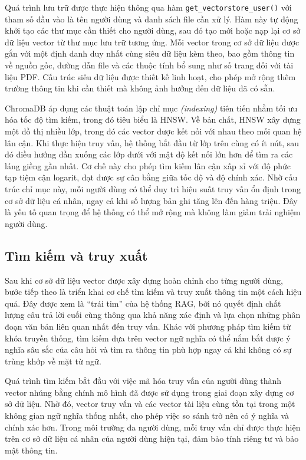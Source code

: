 Quá trình lưu trữ được thực hiện thông qua hàm \texttt{get\_vectorstore\_user()} với tham số đầu vào là tên người dùng và danh sách file cần xử lý. Hàm này tự động khởi tạo các thư mục cần thiết cho người dùng, sau đó tạo mới hoặc nạp lại cơ sở dữ liệu vector từ thư mục lưu trữ tương ứng. Mỗi vector trong cơ sở dữ liệu được gắn với một định danh duy nhất cùng siêu dữ liệu kèm theo, bao gồm thông tin về nguồn gốc, đường dẫn file và các thuộc tính bổ sung như số trang đối với tài liệu PDF. Cấu trúc siêu dữ liệu được thiết kế linh hoạt, cho phép mở rộng thêm trường thông tin khi cần thiết mà không ảnh hưởng đến dữ liệu đã có sẵn.

ChromaDB áp dụng các thuật toán lập chỉ mục \emph{(indexing)} tiên tiến nhằm tối ưu hóa tốc độ tìm kiếm, trong đó tiêu biểu là HNSW. Về bản chất, HNSW xây dựng một đồ thị nhiều lớp, trong đó các vector được kết nối với nhau theo mối quan hệ lân cận. Khi thực hiện truy vấn, hệ thống bắt đầu từ lớp trên cùng có ít nút, sau đó điều hướng dần xuống các lớp dưới với mật độ kết nối lớn hơn để tìm ra các láng giềng gần nhất. Cơ chế này cho phép tìm kiếm lân cận xấp xỉ với độ phức tạp tiệm cận logarit, đạt được sự cân bằng giữa tốc độ và độ chính xác. Nhờ cấu trúc chỉ mục này, mỗi người dùng có thể duy trì hiệu suất truy vấn ổn định trong cơ sở dữ liệu cá nhân, ngay cả khi số lượng bản ghi tăng lên đến hàng triệu. Đây là yếu tố quan trọng để hệ thống có thể mở rộng mà không làm giảm trải nghiệm người dùng.


\subsection{Tìm kiếm và truy xuất}

Sau khi cơ sở dữ liệu vector được xây dựng hoàn chỉnh cho từng người dùng, bước tiếp theo là triển khai cơ chế tìm kiếm và truy xuất thông tin một cách hiệu quả. Đây được xem là ``trái tim'' của hệ thống RAG, bởi nó quyết định chất lượng câu trả lời cuối cùng thông qua khả năng xác định và lựa chọn những phân đoạn văn bản liên quan nhất đến truy vấn. Khác với phương pháp tìm kiếm từ khóa truyền thống, tìm kiếm dựa trên vector ngữ nghĩa có thể nắm bắt được ý nghĩa sâu sắc của câu hỏi và tìm ra thông tin phù hợp ngay cả khi không có sự trùng khớp về mặt từ ngữ.

Quá trình tìm kiếm bắt đầu với việc mã hóa truy vấn của người dùng thành vector nhúng bằng chính mô hình đã được sử dụng trong giai đoạn xây dựng cơ sở dữ liệu. Nhờ đó, vector truy vấn và các vector tài liệu cùng tồn tại trong một không gian ngữ nghĩa thống nhất, cho phép việc so sánh trở nên có ý nghĩa và chính xác hơn. Trong môi trường đa người dùng, mỗi truy vấn chỉ được thực hiện trên cơ sở dữ liệu cá nhân của người dùng hiện tại, đảm bảo tính riêng tư và bảo mật thông tin.

